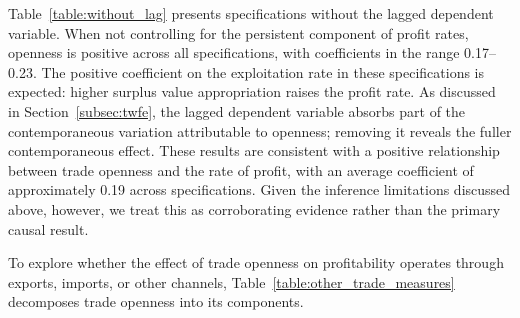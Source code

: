 \documentclass[10pt]{article}
\begin{document}
\par Table~\ref{table:without_lag} presents specifications without the lagged dependent variable. When not controlling for the persistent component of profit rates, openness is positive across all specifications, with coefficients in the range 0.17--0.23. The positive coefficient on the exploitation rate in these specifications is expected: higher surplus value appropriation raises the profit rate. As discussed in Section~\ref{subsec:twfe}, the lagged dependent variable absorbs part of the contemporaneous variation attributable to openness; removing it reveals the fuller contemporaneous effect. These results are consistent with a positive relationship between trade openness and the rate of profit, with an average coefficient of approximately 0.19 across specifications. Given the inference limitations discussed above, however, we treat this as corroborating evidence rather than the primary causal result.

\par To explore whether the effect of trade openness on profitability operates through exports, imports, or other channels, Table~\ref{table:other_trade_measures} decomposes trade openness into its components.
\end{document}
